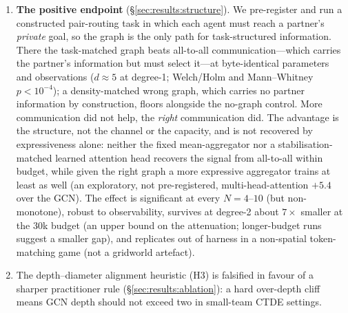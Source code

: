 \documentclass[manuscript, screen, review]{jair}
\newcommand{\algoname}[1]{\textsc{#1}}
\newcommand{\qmix}{\algoname{QMIX}}
\newcommand{\gnnqmix}{\algoname{GNN-QMIX}}
\newcommand{\coordgrid}{\textsc{CoordGrid}}
\newcommand{\SCnbrShrink}{7}          %
\begin{document}
\begin{enumerate}[leftmargin=*,itemsep=0pt,topsep=2pt]
        On MPE \texttt{simple\_spread} the penalty reappears under the
        capacity decomposition (the naive \gnnqmix-vs-\qmix\ comparison is
        null at $N{=}6$; \S\ref{sec:results:mpe}); on \coordgrid\ it persists
        when the GCN is replaced by graph attention
        (\S\ref{sec:results:capacity}), which on MPE narrows but is not
        significant.
  \item \textbf{The positive endpoint} (\S\ref{sec:results:structure}). We
        pre-register and run a constructed pair-routing task in which each
        agent must reach a partner's \emph{private} goal, so the graph is the
        only path for task-structured information. There the task-matched
        graph beats all-to-all communication---which carries the partner's
        information but must select it---at byte-identical parameters and
        observations ($d\approx5$ at degree-1; Welch/Holm and Mann--Whitney
        $p<10^{-4}$); a density-matched wrong graph, which carries no partner
        information by construction, floors alongside the no-graph control.
        More communication did not help, the \emph{right} communication did.
        The advantage is the structure, not the channel or the capacity, and is
        not recovered by expressiveness alone: neither the fixed mean-aggregator
        nor a stabilisation-matched learned attention head recovers the signal
        from all-to-all within budget, while given the right graph a more
        expressive aggregator trains at least as well (an exploratory,
        not pre-registered, multi-head-attention $+5.4$ over the GCN).
        The effect is significant at every $N{=}4$--$10$ (but
        non-monotone), robust to observability, survives at degree-2 about
        $\SCnbrShrink\times$ smaller at the 30k budget (an upper bound on the
        attenuation; longer-budget runs suggest a smaller gap), and replicates
        out of harness in a non-spatial token-matching game (not a gridworld
        artefact).
  \item The depth--diameter alignment heuristic (H3) is falsified in favour
        of a sharper practitioner rule (\S\ref{sec:results:ablation}): a
        hard over-depth cliff means GCN depth should not exceed two in
        small-team CTDE settings.
\end{enumerate}
\end{document}
